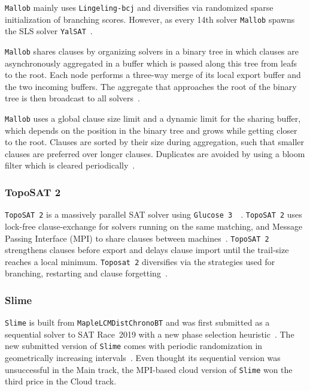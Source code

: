 \documentclass{elsarticle}
\newcommand{\solver}[1]{\texttt{#1}}
\begin{document}
\solver{Mallob} mainly uses \solver{Lingeling-bcj} and diversifies via randomized sparse initialization of branching scores. 
However, as every 14th solver \solver{Mallob} spawns the SLS solver \solver{YalSAT}~\cite{Biere:2018:LingelingYalsat}. 

\solver{Mallob} shares clauses by organizing solvers in a binary tree in which clauses are asynchronously aggregated in a buffer which is passed along this tree from leafs to the root. 
Each node performs a three-way merge of its local export buffer and the two incoming buffers. 
The aggregate that approaches the root of the binary tree is then broadcast to all solvers~\cite{Schreiber:SC2020}. 

\solver{Mallob} uses a global clause size limit and a dynamic limit for the sharing buffer, which depends on the position in the binary tree and grows while getting closer to the root. 
Clauses are sorted by their size during aggregation, such that smaller clauses are preferred over longer clauses. 
Duplicates are avoided by using a bloom filter which is cleared periodically~\cite{Schreiber:SC2020}. 


\subsubsection{TopoSAT 2}

\solver{TopoSAT~2} is a massively parallel SAT solver using \solver{Glucose~3}~\cite{Audemard:2018:Glucose}~\cite{Ehlers:2018:Toposat2}. 
\solver{TopoSAT~2} uses lock-free clause-exchange for solvers running on the same matching, and Message Passing Interface (MPI) to share clauses between machines~\cite{Hamadi:2009:ManySat}. 
\solver{TopoSAT~2} strengthens clauses before export and delays clause import until the trail-size reaches a local minimum. 
\solver{Toposat~2} diversifies via the strategies used for branching, restarting and clause forgetting~\cite{Ehlers:SC2020}. 


\subsubsection{Slime}

\solver{Slime} is built from \solver{MapleLCMDistChronoBT} and was first submitted as a sequential solver to SAT Race~2019 with a new phase selection heuristic~\cite{Riveros:SC2019}. 
The new submitted version of \solver{Slime} comes with periodic randomization in geometrically increasing intervals~\cite{Riveros:SC2020}. 
Even thought its sequential version was unsuccessful in the Main track, the MPI-based cloud version of \solver{Slime} won the third price in the Cloud track. 
\end{document}
